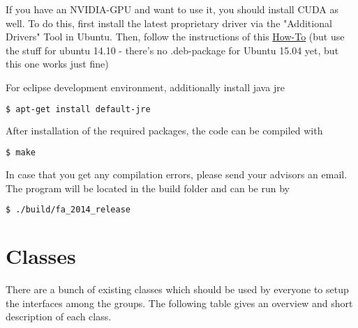 \documentclass[11pt,a4paper]{article}
\begin{document}
If you have an NVIDIA-GPU and want to use it, you should install CUDA as well. To do this, 
first install the latest proprietary driver via the "Additional Drivers" Tool in Ubuntu.
Then, follow the instructions of this \href{www.r-tutor.com/gpu-computing/cuda-installation/cuda7.0-ubuntu}{How-To} 
(but use the stuff for ubuntu 14.10 - there's no .deb-package for Ubuntu 15.04 yet,
but this one works just fine)

For eclipse development environment, additionally install java jre
\begin{lstlisting}[language=sh]
$ apt-get install default-jre
\end{lstlisting}

After installation of the required packages, the code can be compiled with

\begin{lstlisting}[language=sh]
$ make
\end{lstlisting}

In case that you get any compilation errors, please send your advisors an
email. The program will be located in the build folder and can be run by

\begin{lstlisting}[language=sh]
$ ./build/fa_2014_release
\end{lstlisting}





\section{Classes}

There are a bunch of existing classes which should be used by everyone to setup
the interfaces among the groups.
The following table gives an overview and short description of each class.
\end{document}

